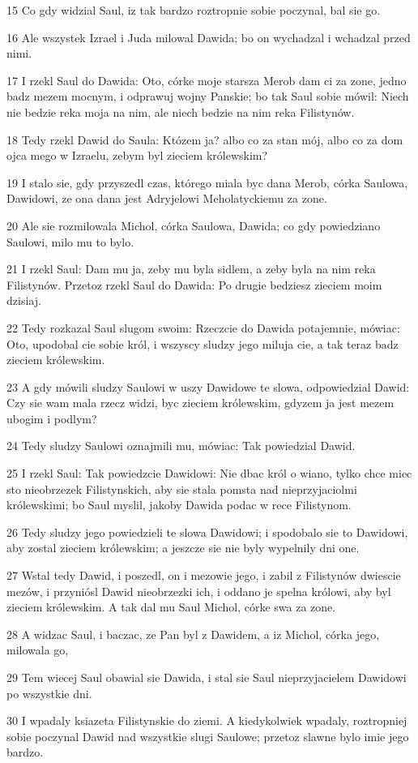 \par 15 Co gdy widzial Saul, iz tak bardzo roztropnie sobie poczynal, bal sie go.
\par 16 Ale wszystek Izrael i Juda milowal Dawida; bo on wychadzal i wchadzal przed nimi.
\par 17 I rzekl Saul do Dawida: Oto, córke moje starsza Merob dam ci za zone, jedno badz mezem mocnym, i odprawuj wojny Panskie; bo tak Saul sobie mówil: Niech nie bedzie reka moja na nim, ale niech bedzie na nim reka Filistynów.
\par 18 Tedy rzekl Dawid do Saula: Któzem ja? albo co za stan mój, albo co za dom ojca mego w Izraelu, zebym byl zieciem królewskim?
\par 19 I stalo sie, gdy przyszedl czas, którego miala byc dana Merob, córka Saulowa, Dawidowi, ze ona dana jest Adryjelowi Meholatyckiemu za zone.
\par 20 Ale sie rozmilowala Michol, córka Saulowa, Dawida; co gdy powiedziano Saulowi, milo mu to bylo.
\par 21 I rzekl Saul: Dam mu ja, zeby mu byla sidlem, a zeby byla na nim reka Filistynów. Przetoz rzekl Saul do Dawida: Po drugie bedziesz zieciem moim dzisiaj.
\par 22 Tedy rozkazal Saul slugom swoim: Rzeczcie do Dawida potajemnie, mówiac: Oto, upodobal cie sobie król, i wszyscy sludzy jego miluja cie, a tak teraz badz zieciem królewskim.
\par 23 A gdy mówili sludzy Saulowi w uszy Dawidowe te slowa, odpowiedzial Dawid: Czy sie wam mala rzecz widzi, byc zieciem królewskim, gdyzem ja jest mezem ubogim i podlym?
\par 24 Tedy sludzy Saulowi oznajmili mu, mówiac: Tak powiedzial Dawid.
\par 25 I rzekl Saul: Tak powiedzcie Dawidowi: Nie dbac król o wiano, tylko chce miec sto nieobrzezek Filistynskich, aby sie stala pomsta nad nieprzyjaciolmi królewskimi; bo Saul myslil, jakoby Dawida podac w rece Filistynom.
\par 26 Tedy sludzy jego powiedzieli te slowa Dawidowi; i spodobalo sie to Dawidowi, aby zostal zieciem królewskim; a jeszcze sie nie byly wypelnily dni one.
\par 27 Wstal tedy Dawid, i poszedl, on i mezowie jego, i zabil z Filistynów dwiescie mezów, i przyniósl Dawid nieobrzezki ich, i oddano je spelna królowi, aby byl zieciem królewskim. A tak dal mu Saul Michol, córke swa za zone.
\par 28 A widzac Saul, i baczac, ze Pan byl z Dawidem, a iz Michol, córka jego, milowala go,
\par 29 Tem wiecej Saul obawial sie Dawida, i stal sie Saul nieprzyjacielem Dawidowi po wszystkie dni.
\par 30 I wpadaly ksiazeta Filistynskie do ziemi. A kiedykolwiek wpadaly, roztropniej sobie poczynal Dawid nad wszystkie slugi Saulowe; przetoz slawne bylo imie jego bardzo.


